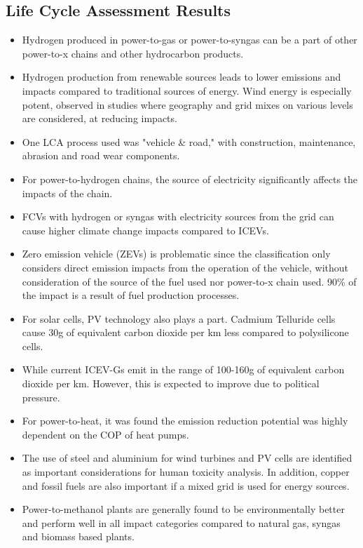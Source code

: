 \documentclass[a4paper]{article}
\begin{document}
\subsection{Life Cycle Assessment Results}
\begin{itemize}
    \item Hydrogen produced in power-to-gas or power-to-syngas can be a part of other power-to-x chains and other hydrocarbon products.
    \item Hydrogen production from renewable sources leads to lower emissions and impacts compared to traditional sources of energy. Wind energy is especially potent, observed in studies where geography and grid mixes on various levels are considered, at reducing impacts.
    \item One LCA process used was "vehicle \& road," with construction, maintenance, abrasion and road wear components.  
    \item For power-to-hydrogen chains, the source of electricity significantly affects the impacts of the chain.
    \item FCVs with hydrogen or syngas with electricity sources from the grid can cause higher climate change impacts compared to ICEVs.
    \item Zero emission vehicle (ZEVs) is problematic since the classification only considers direct emission impacts from the operation of the vehicle, without consideration of the source of the fuel used nor power-to-x chain used. 90\% of the impact is a result of fuel production processes.
    \item For solar cells, PV technology also plays a part. Cadmium Telluride cells cause 30g of equivalent carbon dioxide per km less compared to polysilicone cells.
    \item While current ICEV-Gs emit in the range of 100-160g of equivalent carbon dioxide per km. However, this is expected to improve due to political pressure.
    \item For power-to-heat, it was found the emission reduction potential was highly dependent on the COP of heat pumps.
    \item The use of steel and aluminium for wind turbines and PV cells are identified as important considerations for human toxicity analysis. In addition, copper and fossil fuels are also important if a mixed grid is used for energy sources.
    \item Power-to-methanol plants are generally found to be environmentally better and perform well in all impact categories compared to natural gas, syngas and biomass based plants.

\end{itemize}
\end{document}
